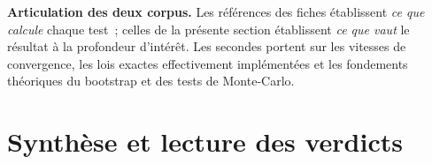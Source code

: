 \documentclass[a4paper,11pt]{article}
\begin{document}
\medskip
\begin{encadre}
\textbf{Articulation des deux corpus.} Les références des fiches établissent
\emph{ce que calcule} chaque test~; celles de la présente section établissent
\emph{ce que vaut} le résultat à la profondeur d'intérêt. Les secondes portent
sur les vitesses de convergence, les lois exactes effectivement implémentées et
les fondements théoriques du bootstrap et des tests de Monte-Carlo.
\end{encadre}


\newpage
\clearpage
\section{Synthèse et lecture des verdicts}
\label{sec:synthese}
\end{document}

